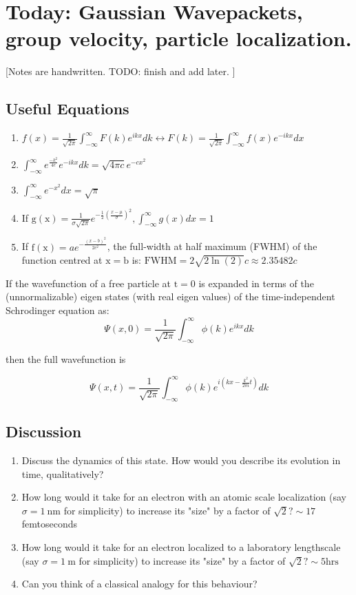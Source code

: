\documentclass{article}
\begin{document}
\section{Today: Gaussian Wavepackets, group velocity, particle localization.}

[Notes are handwritten. TODO: finish and add later. ]

\subsection{Useful Equations}

\begin{enumerate}
    \item $f(x)=\frac{1}{\sqrt{2 \pi}} \int_{-\infty}^{\infty} F(k) e^{i k x} d k \leftrightarrow F(k)=\frac{1}{\sqrt{2 \pi}} \int_{-\infty}^{\infty} f(x) e^{-i k x} d x$
    \item $\int_{-\infty}^{\infty} e^{\frac{-k^{2}}{4 e}} e^{-i k x} d k=\sqrt{4 \pi c} e^{-c x^{2}}$
    \item $\int_{-\infty}^{\infty} e^{-x^{2}} d x=\sqrt{\pi}$
    \item If $\mathrm{g}(\mathrm{x})=\frac{1}{\sigma \sqrt{2 \pi}} e^{-\frac{1}{2}\left(\frac{x-\mu}{\sigma}\right)^{2}}, \int_{-\infty}^{\infty} g(x) d x=1$
    \item If $\mathrm{f}(\mathrm{x})=a e^{-\frac{(x-b)^{2}}{2 c^{2}}}$, the full-width at half maximum (FWHM) of the function centred at $\mathrm{x}=\mathrm{b}$ is: $\mathrm{FWHM}=2 \sqrt{2 \ln (2)} c \approx 2.35482 c$
\end{enumerate}

If the wavefunction of a free particle at $\mathrm{t}=0$ is expanded in terms of the (unnormalizable) eigen states (with real eigen values) of the time-independent Schrodinger equation as:
$$
\Psi(x, 0)=\frac{1}{\sqrt{2 \pi}} \int_{-\infty}^{\infty} \phi(k) e^{i k x} d k
$$

then the full wavefunction is

$$
\Psi(x, t)=\frac{1}{\sqrt{2 \pi}} \int_{-\infty}^{\infty} \phi(k) e^{i\left(k x-\frac{k^{2}}{2 m} t\right)} d k
$$

\subsection{Discussion}

\begin{enumerate}
    \item Discuss the dynamics of this state. How would you describe its evolution in time, qualitatively?
    \item How long would it take for an electron with an atomic scale localization (say $\sigma=1 \mathrm{~nm}$ for simplicity) to increase its "size" by a factor of $\sqrt{2} ? \sim 17$ femtoseconds
    \item How long would it take for an electron localized to a laboratory lengthscale (say $\sigma=1 \mathrm{~m}$ for simplicity) to increase its "size" by a factor of $\sqrt{2} ? \sim 5 \mathrm{hrs}$
    \item Can you think of a classical analogy for this behaviour?
\end{enumerate}
\end{document}
